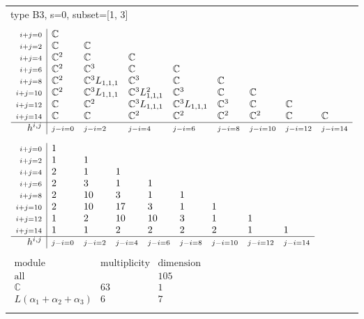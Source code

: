 \documentclass[crop,border=2mm]{standalone}
\begin{document}
\begin{tabular}{l}
{\huge type B3, s=0, subset=[1, 3]}\\ \\


$\displaystyle
\begin{array}{r|l l l l l l l l}
	{\scriptstyle i+j=0}&\mathbb{C}&&&&&&&\\
	{\scriptstyle i+j=2}&\mathbb{C}&\mathbb{C}&&&&&&\\
	{\scriptstyle i+j=4}&\mathbb{C}^{2}&\mathbb{C}&\mathbb{C}&&&&&\\
	{\scriptstyle i+j=6}&\mathbb{C}^{2}&\mathbb{C}^{3}&\mathbb{C}&\mathbb{C}&&&&\\
	{\scriptstyle i+j=8}&\mathbb{C}^{2}&\mathbb{C}^{3}L_{1,1,1}&\mathbb{C}^{3}&\mathbb{C}&\mathbb{C}&&&\\
	{\scriptstyle i+j=10}&\mathbb{C}^{2}&\mathbb{C}^{3}L_{1,1,1}&\mathbb{C}^{3}L_{1,1,1}^{2}&\mathbb{C}^{3}&\mathbb{C}&\mathbb{C}&&\\
	{\scriptstyle i+j=12}&\mathbb{C}&\mathbb{C}^{2}&\mathbb{C}^{3}L_{1,1,1}&\mathbb{C}^{3}L_{1,1,1}&\mathbb{C}^{3}&\mathbb{C}&\mathbb{C}&\\
	{\scriptstyle i+j=14}&\mathbb{C}&\mathbb{C}&\mathbb{C}^{2}&\mathbb{C}^{2}&\mathbb{C}^{2}&\mathbb{C}^{2}&\mathbb{C}&\mathbb{C}\\
	\hline h^{i,j}&{\scriptstyle j-i=0}&{\scriptstyle j-i=2}&{\scriptstyle j-i=4}&{\scriptstyle j-i=6}&{\scriptstyle j-i=8}&{\scriptstyle j-i=10}&{\scriptstyle j-i=12}&{\scriptstyle j-i=14}
\end{array}
$ \\ \\


$\displaystyle
\begin{array}{r|l l l l l l l l}
	{\scriptstyle i+j=0}&1&&&&&&&\\
	{\scriptstyle i+j=2}&1&1&&&&&&\\
	{\scriptstyle i+j=4}&2&1&1&&&&&\\
	{\scriptstyle i+j=6}&2&3&1&1&&&&\\
	{\scriptstyle i+j=8}&2&10&3&1&1&&&\\
	{\scriptstyle i+j=10}&2&10&17&3&1&1&&\\
	{\scriptstyle i+j=12}&1&2&10&10&3&1&1&\\
	{\scriptstyle i+j=14}&1&1&2&2&2&2&1&1\\
	\hline h^{i,j}&{\scriptstyle j-i=0}&{\scriptstyle j-i=2}&{\scriptstyle j-i=4}&{\scriptstyle j-i=6}&{\scriptstyle j-i=8}&{\scriptstyle j-i=10}&{\scriptstyle j-i=12}&{\scriptstyle j-i=14}
\end{array}
$ \\ \\


$\displaystyle
\begin{array}{rll}
	\text{module}&\text{multiplicity}&\text{dimension} \\ \hline \text{all}&&105 \\
	\mathbb{C}&63&1\\
	L\left(\alpha_{1}+\alpha_{2}+\alpha_{3}\right)&6&7
\end{array}
$ \\ \\

\end{tabular}
\end{document}
